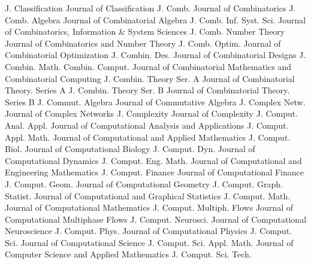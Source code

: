 {J. Classification}
{Journal of Classification}
{J. Comb.}
{Journal of Combinatorics}
{J. Comb. Algebra}
{Journal of Combinatorial Algebra}
{J. Comb. Inf. Syst. Sci.}
{Journal of Combinatorics, Information & System Sciences}
{J. Comb. Number Theory}
{Journal of Combinatorics and Number Theory}
{J. Comb. Optim.}
{Journal of Combinatorial Optimization}
{J. Combin. Des.}
{Journal of Combinatorial Designs}
{J. Combin. Math. Combin. Comput.}
{Journal of Combinatorial Mathematics and Combinatorial Computing}
{J. Combin. Theory Ser. A}
{Journal of Combinatorial Theory. Series A}
{J. Combin. Theory Ser. B}
{Journal of Combinatorial Theory. Series B}
{J. Commut. Algebra}
{Journal of Commutative Algebra}
{J. Complex Netw.}
{Journal of Complex Networks}
{J. Complexity}
{Journal of Complexity}
{J. Comput. Anal. Appl.}
{Journal of Computational Analysis and Applications}
{J. Comput. Appl. Math.}
{Journal of Computational and Applied Mathematics}
{J. Comput. Biol.}
{Journal of Computational Biology}
{J. Comput. Dyn.}
{Journal of Computational Dynamics}
{J. Comput. Eng. Math.}
{Journal of Computational and Engineering Mathematics}
{J. Comput. Finance}
{Journal of Computational Finance}
{J. Comput. Geom.}
{Journal of Computational Geometry}
{J. Comput. Graph. Statist.}
{Journal of Computational and Graphical Statistics}
{J. Comput. Math.}
{Journal of Computational Mathematics}
{J. Comput. Multiph. Flows}
{Journal of Computational Multiphase Flows}
{J. Comput. Neurosci.}
{Journal of Computational Neuroscience}
{J. Comput. Phys.}
{Journal of Computational Physics}
{J. Comput. Sci.}
{Journal of Computational Science}
{J. Comput. Sci. Appl. Math.}
{Journal of Computer Science and Applied Mathematics}
{J. Comput. Sci. Tech.}
